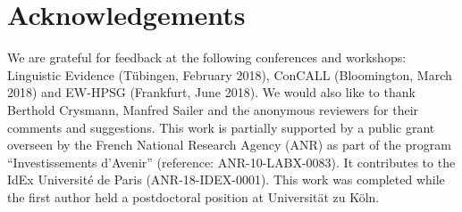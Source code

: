 \documentclass[output=paper]{langsci/langscibook}
\begin{document}
\section*{Acknowledgements}
\begin{sloppypar}
  We are grateful for feedback at the following conferences and
  workshops: Linguistic Evidence (Tübingen, February 2018), ConCALL
  (Bloomington, March 2018) and EW-HPSG (Frankfurt, June 2018). We
  would also like to thank Berthold Crysmann, Manfred Sailer and the
  anonymous reviewers for their comments and suggestions.  This work
  is partially supported by a public grant overseen by the French
  National Research Agency (ANR) as part of the program
  ``Investissements d’Avenir'' (reference: ANR-10-LABX-0083). It
  contributes to the IdEx Université de Paris (ANR-18-IDEX-0001).
  This work was completed while the first author held a postdoctoral
  position at Universität zu Köln.
\end{sloppypar}
{\sloppy\printbibliography[heading=subbibliography,notkeyword=this]}
\end{document}
